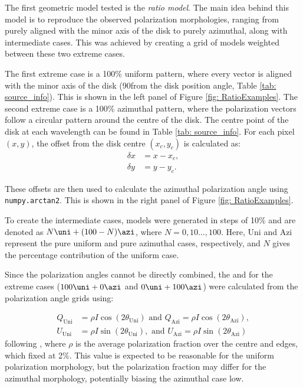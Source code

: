 


The first geometric model tested is the \emph{ratio model}. The main idea behind this model is to reproduce the observed polarization morphologies, ranging from purely aligned with the minor axis of the disk to purely azimuthal, along with intermediate cases. This was achieved by creating a grid of models weighted between these two extreme cases. 

The first extreme case is a 100\% uniform pattern, where every vector is aligned with the minor axis of the disk (90\degg from the disk position angle, Table \ref{tab: source_info}).  This is shown in the left panel of Figure \ref{fig: RatioExamples}. The second extreme case is a 100\% azimuthal pattern, where the polarization vectors follow a circular pattern around the centre of the disk. The centre point of the disk at each wavelength can be found in Table \ref{tab: source_info}. For each pixel $(x, y)$, the offset from the disk centre $(x_c, y_c)$ is calculated as:
\begin{equation}
\begin{aligned}
    \delta x &= x - x_c, \\
    \delta y &= y - y_c.
\end{aligned}
\end{equation}


\noindent These offsets are then used to calculate the azimuthal polarization angle using \texttt{numpy.arctan2}. This is shown in the right panel of Figure \ref{fig: RatioExamples}.



To create the intermediate cases, models were generated in steps of 10\% and are denoted as $N \uni + (100 - N) \azi$, where $N = 0, 10 \ldots, 100$. Here, Uni and Azi represent the pure uniform and pure azimuthal cases, respectively, and $N$ gives the percentage contribution of the uniform case. 

Since the polarization angles cannot be directly combined, the \SQ and \SU for the extreme cases ($100\uni+0\azi$ and $0\uni+100\azi$) were calculated from the polarization angle grids using:

\begin{equation}
\begin{aligned}
Q_{\text{Uni}} &= \rho I \cos(2\theta_{\text{Uni}}) \text{ and }
Q_\text{Azi} = \rho I \cos(2\theta_\text{Azi}),
     \\
U_{\text{Uni}} &=  \rho I \sin(2\theta_{\text{Uni}}) , \text{ and }
U_\text{Azi} =  \rho I \sin(2\theta_\text{Azi}) 
\end{aligned}
\end{equation}
\noindent following \cite{Montier}, where $\rho$ is the average polarization fraction over the centre and edges, which fixed at 2\%. This value is expected to be reasonable for the uniform polarization morphology, but the polarization fraction may differ for the azimuthal morphology, potentially biasing the azimuthal case low.


